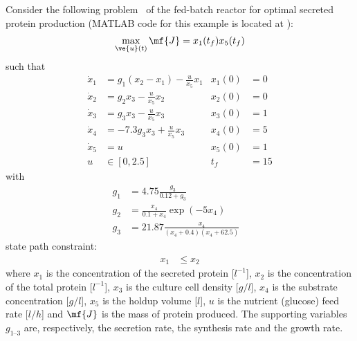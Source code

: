 Consider the following problem~\citep{PR_bior} of the fed-batch
reactor for optimal secreted protein production (MATLAB code for this
example is located at ):
\begin{gather}
\max_{\ve{u}(t)} \mf{J} = x_{1}(t_f)x_{5}(t_f) \label{eq:bior}
\end{gather}
such that
\begin{align}
\dot{x}_1  & = g_{1}(x_{2}-x_{1})-\frac{u}{x_{5}}x_{1} & x_{1}(0) & = 0\\
\dot{x}_2  & = g_{2}x_{3}-\frac{u}{x_{5}}x_{2} & x_{2}(0) & = 0\\
\dot{x}_3  & = g_{3}x_{3}-\frac{u}{x_{5}}x_{3} & x_{3}(0) & = 1 \\
\dot{x}_4  & = -7.3g_{3}x_{3}+\frac{u}{x_{5}}x_{3} & x_{4}(0) & = 5 \\
\dot{x}_5  & = u & x_{5}(0) & = 1 \\
u  & \in [0,2.5] & t_f & = 15
\end{align}
with
\begin{align}
g_{1}  & =  4.75\frac{g_{3}}{0.12+g_{3}} &\\
g_{2}  & = \frac{x_{4}}{0.1+x_{4}}\exp(-5x_{4}) &\\
g_{3}  & = 21.87\frac{x_{4}}{(x_{4}+0.4)(x_{4}+62.5)} &
\end{align}
state path constraint:
\begin{align}
x_{1} & \leq x_{2}
\end{align}
where $x_{1}$ is the concentration of the secreted protein [$l^{-1}$], $x_{2}$ is the concentration of the total protein [$l^{-1}$], $x_{3}$ is the culture cell density [$g/l$], $x_{4}$ is the substrate concentration [$g/l$], $x_{5}$ is the holdup volume [$l$], $u$ is the nutrient (glucose) feed rate [$l/h$] and $\mf{J}$ is the mass of protein produced. The supporting variables $g_{1\text{--}3}$ are, respectively, the secretion rate, the synthesis rate and the growth rate.

